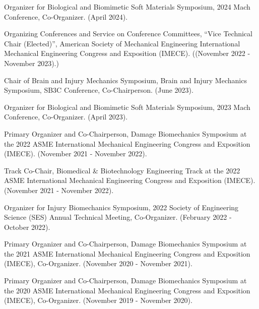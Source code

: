 \documentclass[a4paper,10pt]{article}
\begin{document}
        \noindent Organizer for Biological and Biomimetic Soft Materials Symposium, 2024 Mach Conference, Co-Organizer. (April 2024). \vspace{0.25cm}
        
        \noindent Organizing Conferences and Service on Conference Committees, ``Vice Technical Chair (Elected)'', American Society of Mechanical Engineering International Mechanical Engineering Congress and Exposition (IMECE). ((November 2022 - November 2023).)\vspace{0.25cm}
        
        \noindent Chair of Brain and Injury Mechanics Symposium, Brain and Injury Mechanics Symposium, SB3C Conference, Co-Chairperson. (June 2023). \vspace{0.25cm}
        
        \noindent Organizer for Biological and Biomimetic Soft Materials Symposium, 2023 Mach Conference, Co-Organizer. (April 2023). \vspace{0.25cm}
        
        \noindent Primary Organizer and Co-Chairperson, Damage Biomechanics Symposium at the 2022 ASME International Mechanical Engineering Congress and Exposition (IMECE). (November 2021 - November 2022). \vspace{0.25cm}
        
        \noindent Track Co-Chair, Biomedical & Biotechnology Engineering Track at the 2022 ASME International Mechanical Engineering Congress and Exposition (IMECE). (November 2021 - November 2022). \vspace{0.25cm}
        
        \noindent Organizer for Injury Biomechanics Symposium, 2022 Society of Engineering Science (SES) Annual Technical Meeting, Co-Organizer. (February 2022 - October 2022). \vspace{0.25cm}
        
        \noindent Primary Organizer and Co-Chairperson, Damage Biomechanics Symposium at the 2021 ASME International Mechanical Engineering Congress and Exposition (IMECE), Co-Organizer. (November 2020 - November 2021). \vspace{0.25cm}
        
        \noindent Primary Organizer and Co-Chairperson, Damage Biomechanics Symposium at the 2020 ASME International Mechanical Engineering Congress and Exposition (IMECE), Co-Organizer. (November 2019 - November 2020). \vspace{0.25cm}
        
\end{document}
